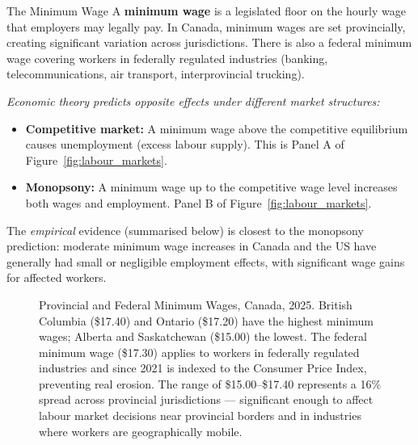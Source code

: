 \begin{defbox}{The Minimum Wage}
A \textbf{minimum wage} is a legislated floor on the hourly wage that
employers may legally pay. In Canada, minimum wages are set provincially,
creating significant variation across jurisdictions. There is also a
federal minimum wage covering workers in federally regulated industries
(banking, telecommunications, air transport, interprovincial trucking).

\textit{Economic theory predicts opposite effects under different market
structures:}
\begin{itemize}
  \item \textbf{Competitive market:} A minimum wage above the competitive
        equilibrium causes unemployment (excess labour supply). This is
        Panel A of Figure~\ref{fig:labour_markets}.
  \item \textbf{Monopsony:} A minimum wage up to the competitive wage
        level increases both wages and employment. Panel B of
        Figure~\ref{fig:labour_markets}.
\end{itemize}

The \textit{empirical} evidence (summarised below) is closest to the
monopsony prediction: moderate minimum wage increases in Canada and the
US have generally had small or negligible employment effects, with
significant wage gains for affected workers.
\end{defbox}

\begin{figure}[H]
\centering
{}
\caption{Provincial and Federal Minimum Wages, Canada, 2025.
British Columbia (\$17.40) and Ontario (\$17.20) have the highest minimum
wages; Alberta and Saskatchewan (\$15.00) the lowest. The federal minimum
wage (\$17.30) applies to workers in federally regulated industries and
since 2021 is indexed to the Consumer Price Index, preventing real erosion.
The range of \$15.00--\$17.40 represents a 16\% spread across provincial
jurisdictions --- significant enough to affect labour market decisions near
provincial borders and in industries where workers are geographically mobile.}
\label{fig:min_wages}
\end{figure}

